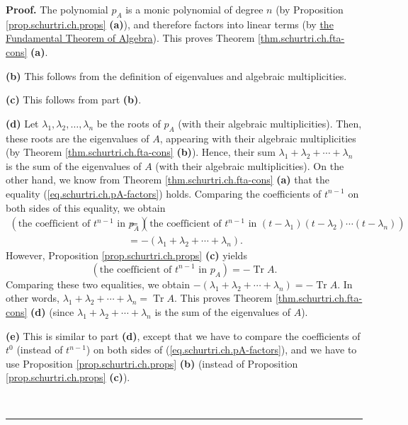 \documentclass[numbers=enddot,12pt,final,onecolumn,notitlepage]{scrartcl}%
\numberwithin{exer}{subsection}
\theoremstyle{definition}
\newenvironment{proof}[1][Proof]{\noindent\textbf{#1.} }{\ \rule{0.5em}{0.5em}}
\begin{document}
\begin{proof}
The polynomial $p_{A}$ is a monic polynomial of degree $n$ (by Proposition
\ref{prop.schurtri.ch.props} \textbf{(a)}), and therefore factors into linear
terms (by
\href{https://en.wikipedia.org/wiki/Fundamental_theorem_of_algebra}{the
Fundamental Theorem of Algebra}). This proves Theorem
\ref{thm.schurtri.ch.fta-cons} \textbf{(a)}. \medskip

\textbf{(b)} This follows from the definition of eigenvalues and algebraic
multiplicities. \medskip

\textbf{(c)} This follows from part \textbf{(b)}. \medskip

\textbf{(d)} Let $\lambda_{1},\lambda_{2},\ldots,\lambda_{n}$ be the roots of
$p_{A}$ (with their algebraic multiplicities). Then, these roots are the
eigenvalues of $A$, appearing with their algebraic multiplicities (by Theorem
\ref{thm.schurtri.ch.fta-cons} \textbf{(b)}). Hence, their sum $\lambda
_{1}+\lambda_{2}+\cdots+\lambda_{n}$ is the sum of the eigenvalues of $A$
(with their algebraic multiplicities). On the other hand, we know from Theorem
\ref{thm.schurtri.ch.fta-cons} \textbf{(a)} that the equality
(\ref{eq.schurtri.ch.pA-factors}) holds. Comparing the coefficients of
$t^{n-1}$ on both sides of this equality, we obtain%
\begin{align*}
\left(  \text{the coefficient of }t^{n-1}\text{ in }p_{A}\right)   &  =\left(
\text{the coefficient of }t^{n-1}\text{ in }\left(  t-\lambda_{1}\right)
\left(  t-\lambda_{2}\right)  \cdots\left(  t-\lambda_{n}\right)  \right) \\
&  =-\left(  \lambda_{1}+\lambda_{2}+\cdots+\lambda_{n}\right)  .
\end{align*}
However, Proposition \ref{prop.schurtri.ch.props} \textbf{(c)} yields
\[
\left(  \text{the coefficient of }t^{n-1}\text{ in }p_{A}\right)
=-\operatorname*{Tr}A.
\]
Comparing these two equalities, we obtain $-\left(  \lambda_{1}+\lambda
_{2}+\cdots+\lambda_{n}\right)  =-\operatorname*{Tr}A$. In other words,
$\lambda_{1}+\lambda_{2}+\cdots+\lambda_{n}=\operatorname*{Tr}A$. This proves
Theorem \ref{thm.schurtri.ch.fta-cons} \textbf{(d)} (since $\lambda
_{1}+\lambda_{2}+\cdots+\lambda_{n}$ is the sum of the eigenvalues of $A$).
\medskip

\textbf{(e)} This is similar to part \textbf{(d)}, except that we have to
compare the coefficients of $t^{0}$ (instead of $t^{n-1}$) on both sides of
(\ref{eq.schurtri.ch.pA-factors}), and we have to use Proposition
\ref{prop.schurtri.ch.props} \textbf{(b)} (instead of Proposition
\ref{prop.schurtri.ch.props} \textbf{(c)}).\medskip


\end{proof}
\end{document}
